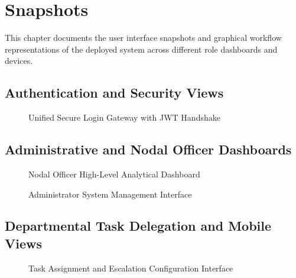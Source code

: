 \chapter{Snapshots}
\label{ch:snapshots}

This chapter documents the user interface snapshots and graphical workflow representations of the deployed system across different role dashboards and devices.

\section{Authentication and Security Views}
\begin{figure}[htbp]
    \centering
    \caption{Unified Secure Login Gateway with JWT Handshake}
    \label{fig:login_screen}
\end{figure}

\section{Administrative and Nodal Officer Dashboards}
\begin{figure}[htbp]
    \centering
    \caption{Nodal Officer High-Level Analytical Dashboard}
    \label{fig:nodal_dashboard}
\end{figure}

\begin{figure}[htbp]
    \centering
    \caption{Administrator System Management Interface}
    \label{fig:admin_panel}
\end{figure}

\section{Departmental Task Delegation and Mobile Views}
\begin{figure}[htbp]
    \centering
    \caption{Task Assignment and Escalation Configuration Interface}
    \label{fig:task_assignment}
\end{figure}

